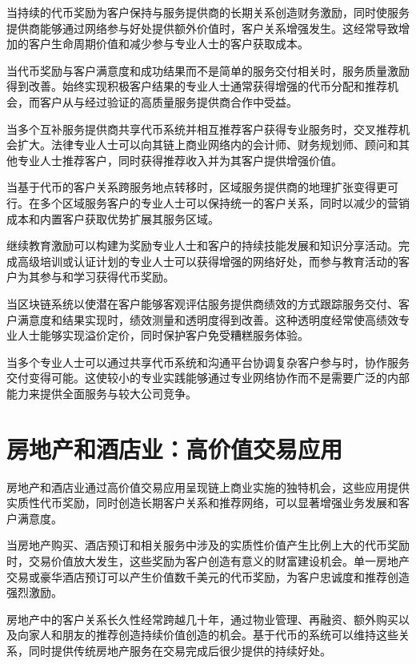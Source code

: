 \documentclass[
  Letterpaper,
]{scrbook}
\begin{document}
当持续的代币奖励为客户保持与服务提供商的长期关系创造财务激励，同时使服务提供商能够通过网络参与好处提供额外价值时，客户关系增强发生。这经常导致增加的客户生命周期价值和减少参与专业人士的客户获取成本。

当代币奖励与客户满意度和成功结果而不是简单的服务交付相关时，服务质量激励得到改善。始终实现积极客户结果的专业人士通常获得增强的代币分配和推荐机会，而客户从与经过验证的高质量服务提供商合作中受益。

当多个互补服务提供商共享代币系统并相互推荐客户获得专业服务时，交叉推荐机会扩大。法律专业人士可以向其链上商业网络内的会计师、财务规划师、顾问和其他专业人士推荐客户，同时获得推荐收入并为其客户提供增强价值。

当基于代币的客户关系跨服务地点转移时，区域服务提供商的地理扩张变得更可行。在多个区域服务客户的专业人士可以保持统一的客户关系，同时以减少的营销成本和内置客户获取优势扩展其服务区域。

继续教育激励可以构建为奖励专业人士和客户的持续技能发展和知识分享活动。完成高级培训或认证计划的专业人士可以获得增强的网络好处，而参与教育活动的客户为其参与和学习获得代币奖励。

当区块链系统以使潜在客户能够客观评估服务提供商绩效的方式跟踪服务交付、客户满意度和结果实现时，绩效测量和透明度得到改善。这种透明度经常使高绩效专业人士能够实现溢价定价，同时保护客户免受糟糕服务体验。

当多个专业人士可以通过共享代币系统和沟通平台协调复杂客户参与时，协作服务交付变得可能。这使较小的专业实践能够通过专业网络协作而不是需要广泛的内部能力来提供全面服务与较大公司竞争。

\section{房地产和酒店业：高价值交易应用}\label{ux623fux5730ux4ea7ux548cux9152ux5e97ux4e1aux9ad8ux4ef7ux503cux4ea4ux6613ux5e94ux7528}

房地产和酒店业通过高价值交易应用呈现链上商业实施的独特机会，这些应用提供实质性代币奖励，同时创造长期客户关系和推荐网络，可以显著增强业务发展和客户满意度。

当房地产购买、酒店预订和相关服务中涉及的实质性价值产生比例上大的代币奖励时，交易价值放大发生，这些奖励为客户创造有意义的财富建设机会。单一房地产交易或豪华酒店预订可以产生价值数千美元的代币奖励，为客户忠诚度和推荐创造强烈激励。

房地产中的客户关系长久性经常跨越几十年，通过物业管理、再融资、额外购买以及向家人和朋友的推荐创造持续价值创造的机会。基于代币的系统可以维持这些关系，同时提供传统房地产服务在交易完成后很少提供的持续好处。
\end{document}
